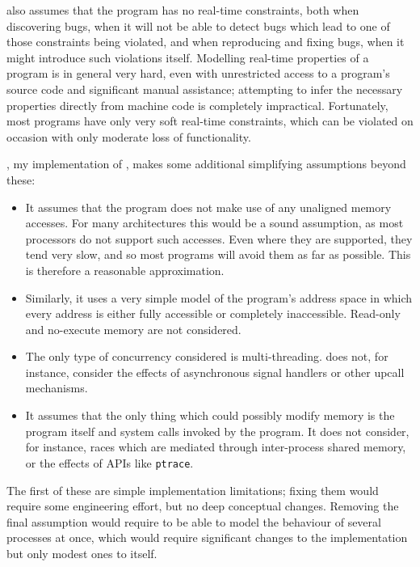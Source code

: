 {\Technique} also assumes that the program has no real-time
constraints, both when discovering bugs, when it will not be able to
detect bugs which lead to one of those constraints being violated, and
when reproducing and fixing bugs, when it might introduce such
violations itself.  Modelling real-time properties of a program is in
general very hard, even with unrestricted access to a program's source
code and significant manual assistance\needCite{}; attempting to infer
the necessary properties directly from machine code is completely
impractical.  Fortunately, most programs have only very soft real-time
constraints, which can be violated on occasion with only moderate loss
of functionality.

{\Implementation}, my implementation of {\technique}, makes some
additional simplifying assumptions beyond these:
\begin{itemize}
\item It assumes that the program does not make use of any unaligned
  memory accesses.  For many architectures this would be a sound
  assumption, as most processors do not support such accesses.  Even
  where they are supported, they tend very slow, and so most programs
  will avoid them as far as possible.  This is therefore a reasonable
  approximation.

\item Similarly, it uses a very simple model of the program's address
  space in which every address is either fully accessible or
  completely inaccessible.  Read-only and no-execute memory\needCite{}
  are not considered.

\item The only type of concurrency considered is multi-threading.
  {\Implementation} does not, for instance, consider the effects of
  asynchronous signal handlers or other upcall mechanisms.

\item It assumes that the only thing which could possibly modify
  memory is the program itself and system calls invoked by the
  program.  It does not consider, for instance, races which are
  mediated through inter-process shared memory, or the effects of APIs
  like \texttt{ptrace}.
\end{itemize}
The first of these are simple implementation limitations; fixing them
would require some engineering effort, but no deep conceptual changes.
Removing the final assumption would require {\implementation} to be
able to model the behaviour of several processes at once, which would
require significant changes to the implementation but only modest ones
to {\technique} itself.

